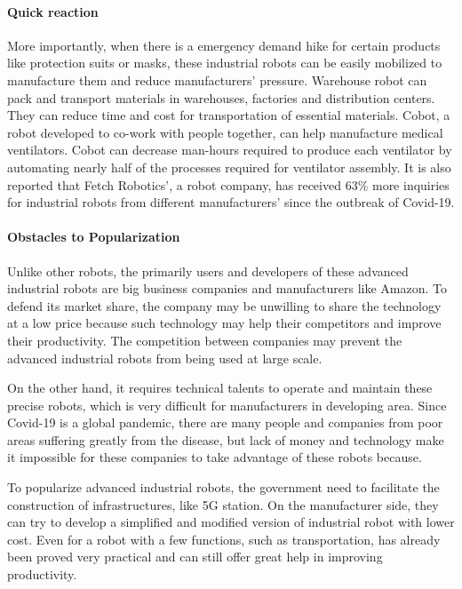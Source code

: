 \documentclass[a4paper]{article}
\begin{document}
\paragraph{Quick reaction} 
    More importantly, when there is a emergency demand hike for certain products like protection suits or masks, these industrial robots can be easily mobilized to manufacture them and reduce manufacturers' pressure. Warehouse robot can pack and transport materials in warehouses, factories and distribution centers\cite{62}. They can reduce time and cost for transportation of essential materials. Cobot, a robot developed to co-work with people together, can help manufacture medical ventilators\cite{63}. Cobot can decrease man-hours required to produce each ventilator by automating nearly half of the processes required for ventilator assembly. It is also reported that Fetch Robotics', a robot company, has received 63\% more inquiries for industrial robots from different manufacturers' since the outbreak of Covid-19. 
\paragraph{Obstacles to Popularization}
    Unlike other robots, the primarily users and developers of these advanced industrial robots are big business companies and manufacturers like Amazon. To defend its market share, the company may be unwilling to share the technology at a low price because such technology may help their competitors and improve their productivity. The competition between companies may prevent the advanced industrial robots from being used at large scale. 
\par 
    On the other hand, it requires technical talents to operate and maintain these precise robots, which is very difficult for manufacturers in developing area. Since Covid-19 is a global pandemic, there are many people and companies from poor areas suffering greatly from the disease, but lack of money and technology make it impossible for these companies to take advantage of these robots because. 
\par 
    To popularize advanced industrial robots, the government need to facilitate the construction of infrastructures, like 5G station. On the manufacturer side, they can try to develop a simplified and modified version of industrial robot with lower cost. Even for a robot with a few functions, such as transportation, has already been proved very practical and can still offer great help in improving productivity.
\end{document}
